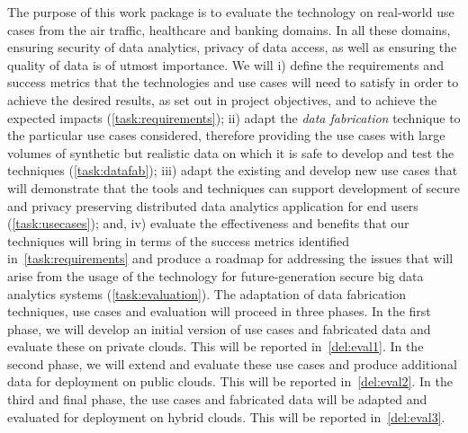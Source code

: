 \begin{Workpackage}{\thewpno}
\begin{WPDescription}
The purpose of this work package is to evaluate the \TheProject technology on real-world use cases from the air traffic, healthcare and banking domains. In all these domains, ensuring security of data analytics, privacy of data access, as well as ensuring the quality of data is of utmost importance. We will i) define the requirements and success metrics that the \TheProject{} technologies and use cases will need to satisfy in order to achieve the desired results, as set out in project objectives, and to achieve the expected impacts (\ref{task:requirements}); ii) adapt the \emph{data fabrication} technique to the particular use cases considered, therefore providing the use cases with large volumes of synthetic but realistic data on which it is safe to develop and test the \TheProject{} techniques (\ref{task:datafab}); iii) adapt the existing and develop new use cases that will demonstrate that the \TheProject{} tools and techniques can support development of secure and privacy preserving distributed data analytics application for end users (\ref{task:usecases}); and, iv)  evaluate the effectiveness and benefits that our techniques will bring in terms of the success metrics identified in~\ref{task:requirements} and produce a roadmap for addressing the issues that will arise from the usage of the \TheProject{} technology for future-generation secure big data analytics systems (\ref{task:evaluation}). The adaptation of data fabrication techniques, use cases and evaluation will proceed in three phases. In the first phase, we will develop an initial version of use cases and fabricated data and evaluate these on private clouds. This will be reported in~\ref{del:eval1}. In the second phase, we will extend and evaluate these use cases and produce additional data for deployment on public clouds. This will be reported in~\ref{del:eval2}. In the third and final phase, the use cases and fabricated data will be adapted and evaluated for deployment on hybrid clouds. This will be reported in~\ref{del:eval3}.
\end{WPDescription}

\begin{Task}


\end{Task}
\end{Workpackage}
